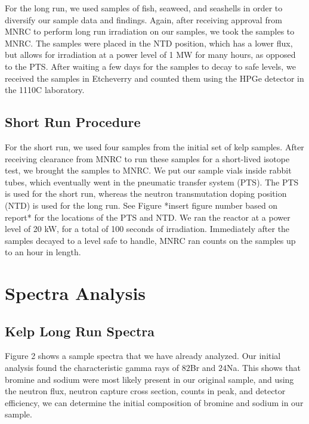 \documentclass[]{article}
\begin{document}
For the long run, we used samples of fish, seaweed, and seashells in order to diversify our sample data and findings.  Again, after receiving approval from MNRC to perform long run irradiation on our samples, we took the samples to MNRC.  The samples were placed in the NTD position, which has a lower flux, but allows for irradiation at a power level of 1 MW for many hours, as opposed to the PTS.  After waiting a few days for the samples to decay to safe levels, we received the samples in Etcheverry and counted them using the HPGe detector in the 1110C laboratory.

\subsection{Short Run Procedure}
For the short run, we used four samples from the initial set of kelp samples.  After receiving clearance from MNRC to run these samples for a short-lived isotope test, we brought the samples to MNRC.  We put our sample vials inside rabbit tubes, which eventually went in the pneumatic transfer system (PTS).    The PTS is used for the short run, whereas the neutron transmutation doping position (NTD) is used for the long run.  See Figure *insert figure number based on report* for the locations of the PTS and NTD.  We ran the reactor at a power level of 20 kW, for a total of 100 seconds of irradiation. Immediately after the samples decayed to a level safe to handle, MNRC ran counts on the samples up to an hour in length.  



\section{Spectra Analysis}
\subsection{Kelp Long Run Spectra}
Figure 2 shows a sample spectra that we have already analyzed. Our initial analysis found the characteristic gamma rays of ${82}$Br and ${24}$Na. This shows that bromine and sodium were most likely present in our original sample, and using the neutron flux, neutron capture cross section, counts in peak, and detector efficiency, we can determine the initial composition of bromine and sodium in our sample.
\end{document}
